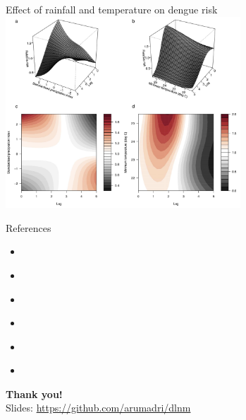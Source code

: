 \documentclass[english]{beamer}
\newcommand{\alertblue}[1]{{\color{blue}#1}}
\begin{document}
\begin{frame}{Effect of rainfall and temperature on dengue risk}
\centering
    \includegraphics[width=8.8cm,keepaspectratio]{images/dlnm_example_2.png}    
\end{frame}
\begin{frame}{References}
    \begin{itemize}
        \item \cite{gasparrini_distributed_2010}
        \item \cite{gasparrini_distributed_2011}
        \item\cite{gareth_james__daniela_witten__trevor_hastie_introduction_nodate}
        \item \cite{gasparrini_attributable_2014}
        \item \cite{asenmacher_exposure-lag-response_2016}
        \item \cite{lowe_nonlinear_2018}
    \end{itemize}
    \vspace{1em}
    \centering
    \alertblue{\textbf{\large Thank you!}} \\
    \vspace{1em}
    Slides: \href{https://github.com/arumadri/dlnm}{\alertblue{https://github.com/arumadri/dlnm}}
\end{frame}
\end{document}

